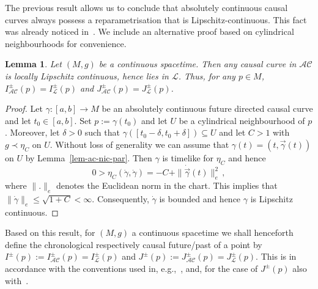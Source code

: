 \documentclass[reqno]{amsart}
\numberwithin{equation}{section}
\theoremstyle{plain}
\newtheorem{lemma}[theorem]{Lemma}
\theoremstyle{definition}
\theoremstyle{remark}
\begin{document}
The previous result allows us to conclude that absolutely continuous causal curves always possess a reparametrisation that
is Lipschitz-continuous. This fact was already noticed in~\cite[Rem.\ 2.3]{Min:19}. We include an alternative proof
based on cylindrical neighbourhoods for convenience.
\begin{lemma}\label{lem:lip_is_ac}
 Let $(M,g)$ be a continuous spacetime. Then any causal curve in $\mathcal{AC}$ is locally Lipschitz continuous, hence lies in 
$\mathcal{L}$. Thus, for any $p\in M$, $I^\pm_{\mathcal{AC}}(p) = I^\pm_{\mathcal{L}}(p)$ and $J^\pm_{\mathcal{AC}}(p) = 
J^\pm_{\mathcal{L}}(p)$.
\end{lemma}
\begin{proof}
Let $\gamma\colon[a,b]\rightarrow M$ be an absolutely continuous future directed causal curve and let $t_0\in[a,b]$. Set 
$p:=\gamma(t_0)$ and let $U$ be a cylindrical neighbourhood of $p$. Moreover, let $\delta>0$ such that 
$\gamma([t_0-\delta,t_0+\delta])\subseteq U$ and let $C>1$ with $g\prec \eta_C$ on $U$. Without loss of generality we can 
assume that $\gamma(t)=(t,\vec\gamma(t))$ on $U$ by Lemma~\ref{lem-ac-nic-par}. Then $\gamma$ is timelike for $\eta_C$ and 
hence
\begin{equation}
 0>\eta_C(\dot\gamma,\dot\gamma) = -C + \|\dot{\vec\gamma}(t)\|_e^2\,,
\end{equation}
where $\|.\|_e$ denotes the Euclidean norm in the chart. This implies that $\|\dot\gamma\|_e\leq \sqrt{1+C}<\infty$. 
Consequently, $\dot\gamma$ is bounded and hence $\gamma$ is 
Lipschitz continuous.
\end{proof}
Based on this result, for $(M,g)$ a continuous spacetime we shall henceforth
define the chronological respectively causal future/past of a point by 
$I^\pm(p):=I^\pm_{\mathcal{AC}}(p)=I^\pm_{\mathcal{L}}(p)$ and $J^\pm(p)
:=J^\pm_{\mathcal{AC}}(p)=J^\pm_{\mathcal{L}}(p)$. This is in accordance with the conventions used in, e.g.,~\cite{Chr:11,CG:12,FS:12,KSSV:14,Sae:16,GGKS:18,GL:18, GLS:18}, and, for the case of $J^\pm(p)$ also with~\cite{BS:18,Min:15,Min:19}. 
\end{document}

